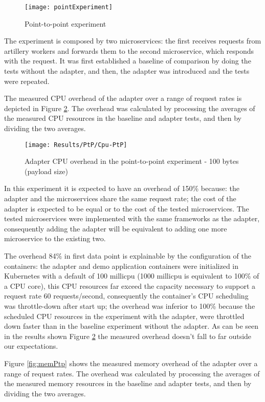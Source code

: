 \begin{figure}[htbp]
    \centering
    \centerline{\texttt{[image: pointExperiment]}}
    \caption{Point-to-point experiment}
    \label{fig:point}
\end{figure}

The experiment is composed by two microservices:
the first receives requests from artillery workers and forwards them to the second microservice, which responds with the request.
It was first established a baseline of comparison
by doing the tests without the adapter, and then, the adapter was introduced and the tests were repeated.

The measured CPU overhead of the adapter over a
range of request rates is depicted in Figure \ref{fig:cpuPtp}.
The overhead was calculated by processing the averages of the measured CPU resources in the baseline and adapter tests, and then by dividing the two averages.

\begin{figure}[htbp]
    \centering
    \centerline{\texttt{[image: Results/PtP/Cpu-PtP]}}
    \caption{Adapter CPU overhead in the point-to-point experiment - 100 bytes (payload size)}
    \label{fig:cpuPtp}
\end{figure}

In this experiment it is expected to have an overhead of 150\% because: the adapter and the microservices share the same request rate;
the cost of the adapter is expected to be equal or to the cost of the tested microservices.
The tested microservices were implemented with the same frameworks as the adapter, consequently adding the adapter will be equivalent to adding one more microservice to the existing two.

The overhead 84\% in first data point is explainable by the configuration of the containers:
the adapter and demo application containers were initialized in Kubernetes with a default of 100 millicpu (1000 millicpu is equivalent to 100\% of a CPU core),
this CPU resources far exceed the capacity necessary to support a request rate 60 requests/second,
consequently the container's CPU scheduling was throttle-down after start up;
the overhead was inferior to 100\% because the scheduled CPU resources in the experiment with the adapter, were throttled down faster than in the baseline experiment without the adapter.
As can be seen in the results shown Figure \ref{fig:cpuPtp} the measured overhead doesn't fall to far outside our expectations.

Figure \ref{fig:memPtp} shows the measured memory overhead of the adapter over a
range of request rates.
The overhead was calculated by processing the averages of the measured memory resources in the baseline and adapter tests, and then by dividing the two averages.

